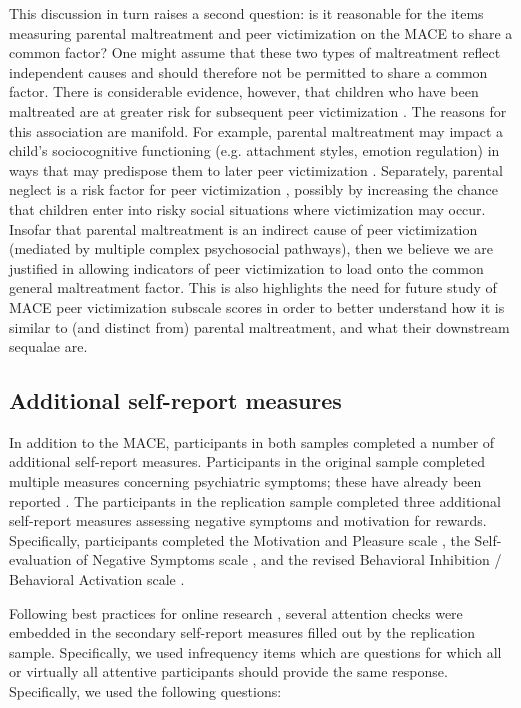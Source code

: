 \documentclass[letterpaper,man,natbib,noextraspace,floatsintext,longtable,12pt]{apa6}
\begin{document}
This discussion in turn raises a second question: is it reasonable for the items measuring parental maltreatment and peer victimization on the MACE to share a common factor? One might assume that these two types of maltreatment reflect independent causes and should therefore not be permitted to share a common factor. There is considerable evidence, however, that children who have been maltreated are at greater risk for subsequent peer victimization . The reasons for this association are manifold. For example, parental maltreatment may impact a child's sociocognitive functioning (e.g. attachment styles, emotion regulation) in ways that may predispose them to later peer victimization . Separately, parental neglect is a risk factor for peer victimization , possibly by increasing the chance that children enter into risky social situations where victimization may occur. Insofar that parental maltreatment is an indirect cause of peer victimization (mediated by multiple complex psychosocial pathways), then we believe we are justified in allowing indicators of peer victimization to load onto the common general maltreatment factor. This is also highlights the need for future study of MACE peer victimization subscale scores in order to better understand how it is similar to (and distinct from) parental maltreatment, and what their downstream sequalae are. 

\subsection*{Additional self-report measures}

In addition to the MACE, participants in both samples completed a number of additional self-report measures. Participants in the original sample completed multiple measures concerning psychiatric symptoms; these have already been reported . The participants in the replication sample completed three additional self-report measures assessing negative symptoms and motivation for rewards. Specifically, participants completed the Motivation and Pleasure scale , the Self-evaluation of Negative Symptoms scale , and the revised Behavioral Inhibition / Behavioral Activation scale .

Following best practices for online research , several attention checks were embedded in the secondary self-report measures filled out by the replication sample. Specifically, we used infrequency items which are questions for which all  or virtually all attentive participants should provide the same response. Specifically, we used the following questions:
\end{document}
